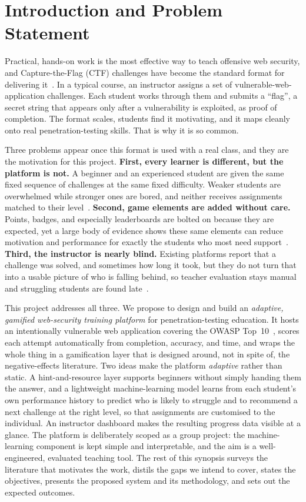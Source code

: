 \section{Introduction and Problem Statement}

Practical, hands-on work is the most effective way to teach offensive web
security, and Capture-the-Flag (CTF) challenges have become the standard format
for delivering it~\cite{Chapman2014picoctf,Svabensky2020what}.
In a typical course, an instructor assigns a set of vulnerable-web-application
challenges. Each student works through them and submits a ``flag'', a secret
string that appears only after a vulnerability is exploited, as proof of
completion. The format scales, students find it motivating, and it maps cleanly
onto real penetration-testing skills. That is why it is so common.

Three problems appear once this format is used with a real class, and they are the
motivation for this project. \textbf{First, every learner is different, but the
platform is not.} A beginner and an experienced student are given the same fixed
sequence of challenges at the same fixed difficulty. Weaker students are
overwhelmed while stronger ones are bored, and neither receives assignments matched
to their level~\cite{Streicher2016adaptive,Vykopal2022smart}. \textbf{Second, game
elements are added without care.} Points, badges, and especially leaderboards are
bolted on because they are expected, yet a large body of evidence shows these same
elements can reduce motivation and performance for exactly the students who most
need support~\cite{Toda2018dark,Almeida2023negative}. \textbf{Third, the instructor
is nearly blind.} Existing platforms report that a challenge was solved, and
sometimes how long it took, but they do not turn that into a usable picture of who
is falling behind, so teacher evaluation stays manual and struggling students are
found late~\cite{Svabensky2024detecting}.

This project addresses all three. We propose to design and build an
\emph{adaptive, gamified web-security training platform} for penetration-testing
education. It hosts an intentionally vulnerable web application covering the OWASP
Top~10~\cite{Owasp2021top10}, scores each attempt automatically from completion,
accuracy, and time, and wraps the whole thing in a gamification layer that is
designed around, not in spite of, the negative-effects literature. Two ideas make
the platform \emph{adaptive} rather than static. A hint-and-resource layer supports
beginners without simply handing them the answer, and a lightweight
machine-learning model learns from each student's own performance history to
predict who is likely to struggle and to recommend a next challenge at the right
level, so that assignments are customised to the individual. An instructor
dashboard makes the resulting progress data visible at a glance. The platform is
deliberately scoped as a group project: the machine-learning component is kept
simple and interpretable, and the aim is a well-engineered, evaluated teaching tool.
The rest of this synopsis surveys the literature that motivates the work, distils
the gaps we intend to cover, states the objectives, presents the proposed system
and its methodology, and sets out the expected outcomes.
